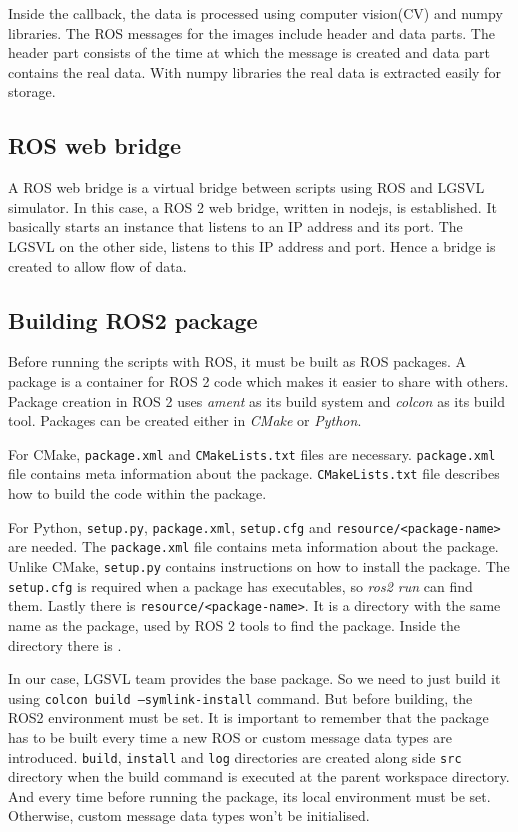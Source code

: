 Inside the callback, the data is processed using computer vision(CV) and numpy libraries.
The ROS messages for the images include header and data
parts. The header part consists of the time at which the message is created and data part
contains the real data. With numpy libraries the real data is extracted easily for storage.

\subsection{ROS web bridge}
A ROS web bridge is a virtual bridge between scripts using ROS and LGSVL simulator. In this
case, a ROS 2 web bridge, written in nodejs, is established. It basically starts an instance
that listens to an IP address and its port. The LGSVL on the other side, listens to this
IP address and port. Hence a bridge is created to allow flow of data.

\iffalse
\subsection{Building ROS2 package}
Before running the scripts with ROS, it must be built as ROS packages.  A package is a
container for ROS 2 code which makes it easier to share with others. Package creation in
ROS 2 uses \textit{ament} as its build system and \textit{colcon} as its build tool.
Packages can be created either in \textit{CMake} or \textit{Python}.

For CMake, \texttt{package.xml} and \texttt{CMakeLists.txt} files are necessary. \texttt{package.xml}
file contains meta information about the package. \texttt{CMakeLists.txt} file describes how to build the code within the package.

For Python, \texttt{setup.py}, \texttt{package.xml}, \texttt{setup.cfg} and
\texttt{resource/<package-name>} are needed. The \texttt{package.xml} file contains meta
information about the package. Unlike CMake, \texttt{setup.py} contains instructions on
how to install the package. The \texttt{setup.cfg} is required when a package has
executables, so \textit{ros2 run} can find them. Lastly there is
\texttt{resource/<package-name>}. It is a directory with the same name as the package,
used by ROS 2 tools to find the package. Inside the directory there is \texttt{}.

In our case, LGSVL team provides the base package. So we need to just build it using
\texttt{colcon build --symlink-install} command. But before building, the ROS2 environment
 must be set. It is important to remember that the package has
to be built every time a new ROS or custom message data types are introduced. \texttt{build},
\texttt{install} and \texttt{log} directories are created along side \texttt{src}
directory when the build command is executed at the parent workspace directory. And
every time before running the package, its local environment must be set. Otherwise,
custom message data types won't be initialised.

